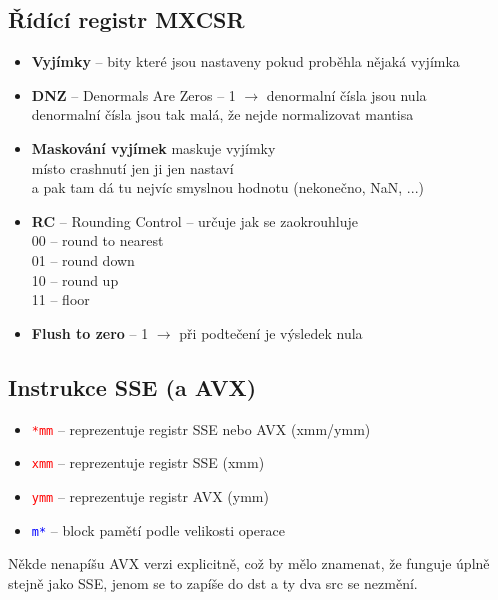 \documentclass[
]{cz_sablona}
\newcommand{\reg}[1]{\texttt{\textcolor{red}{#1}}}
\newcommand{\mem}[1]{\texttt{\textcolor{blue}{#1}}}
\begin{document}
\subsection{Řídící registr MXCSR}
\begin{itemize}
    \item \textbf{Vyjímky} -- bity které jsou nastaveny pokud proběhla nějaká vyjímka
    \item \textbf{DNZ} -- Denormals Are Zeros -- 1 $\rightarrow$ denormalní čísla jsou nula\\
    denormalní čísla jsou tak malá, že nejde normalizovat mantisa
    \item \textbf{Maskování vyjímek} maskuje vyjímky\\
    místo crashnutí jen ji jen nastaví\\
    a pak tam dá tu nejvíc smyslnou hodnotu (nekonečno, NaN, ...)
    \item \textbf{RC} -- Rounding Control -- určuje jak se zaokrouhluje\\
    00 -- round to nearest\\
    01 -- round down\\
    10 -- round up\\
    11 -- floor
    \item \textbf{Flush to zero} -- 1 $\rightarrow$ při podtečení je výsledek nula
\end{itemize}

\subsection{Instrukce SSE (a AVX)}
\begin{itemize}
    \item \reg{*mm} -- reprezentuje registr SSE nebo AVX (xmm/ymm)
    \item \reg{xmm} -- reprezentuje registr SSE (xmm)
    \item \reg{ymm} -- reprezentuje registr AVX (ymm)
    \item \mem{m*} -- block pamětí podle velikosti operace
\end{itemize}
Někde nenapíšu AVX verzi explicitně, což by mělo znamenat, že funguje úplně stejně
jako SSE, jenom se to zapíše do dst a ty dva src se nezmění.
\end{document}
